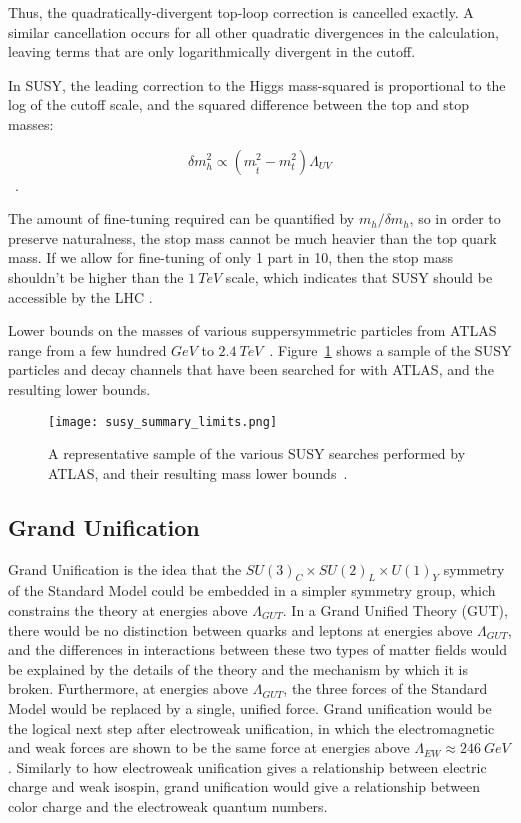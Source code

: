 Thus, the quadratically-divergent top-loop correction is cancelled exactly.
A similar cancellation occurs for all other quadratic divergences in the calculation,
leaving terms that are only logarithmically divergent in the cutoff.

In SUSY, the leading correction to the Higgs mass-squared is proportional to the log of the cutoff scale,
and the squared difference between the top and stop masses:

\begin{equation}\label{eq:susy_higgs_correction}
    \delta m_h^2 \propto \left(m_{\tilde{t}}^2 - m_t^2\right)  \Lambda_{UV}
\end{equation}~\cite{susy-pheno-2000}.

The amount of fine-tuning required can be quantified by $m_h / \delta m_h $, so in order to preserve naturalness,
the stop mass cannot be much heavier than the top quark mass.
If we allow for fine-tuning of only 1 part in 10, then the stop mass shouldn't be higher than the $1~TeV$ scale,
which indicates that SUSY should be accessible by the LHC .

Lower bounds on the masses of various suppersymmetric particles from ATLAS range from a few hundred $GeV$ to $2.4~TeV$~\cite{susy-summary-public}.
Figure~\ref{fig:susy_limits_summary} shows a sample of the SUSY particles and decay channels that have been searched for with ATLAS, and the resulting lower bounds.

\begin{figure}[!ht]
    \centering
\texttt{[image: susy\_summary\_limits.png]}
\caption{A representative sample of the various SUSY searches performed by ATLAS, and their resulting mass lower bounds~\cite{susy-summary-public}.}
\label{fig:susy_limits_summary}
\end{figure}

\subsection{Grand Unification}\label{subsec:susy_unification}

Grand Unification is the idea that the $SU(3)_C \times SU(2)_L \times U(1)_Y$ symmetry of the Standard Model
could be embedded in a simpler symmetry group, which constrains the theory at energies above $\Lambda_{GUT}$.
In a Grand Unified Theory (GUT), there would be no distinction between quarks and leptons at energies above $\Lambda_{GUT}$,
and the differences in interactions between these two types of matter fields would be explained by the details of the
theory and the mechanism by which it is broken.
Furthermore, at energies above $\Lambda_{GUT}$, the three forces of the Standard Model would be replaced by a single, unified force.
Grand unification would be the logical next step after electroweak unification,
in which the electromagnetic and weak forces are shown to be the same force at energies above $\Lambda_{EW}\approx 246~GeV$.
Similarly to how electroweak unification gives a relationship between electric charge and weak isospin,
grand unification would give a relationship between color charge and the electroweak quantum numbers.

